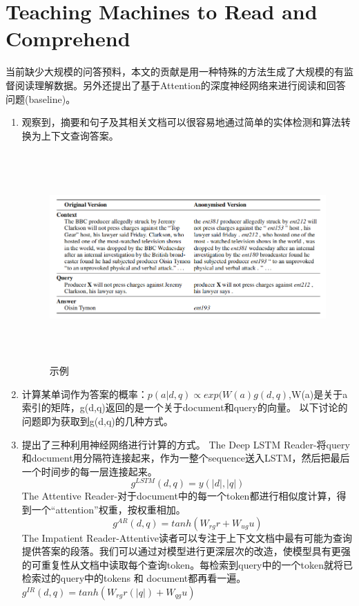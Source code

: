\documentclass[a4paper,UTF8]{article}
\numberwithin{equation}{section}
\begin{document}
\section{Teaching Machines to Read and Comprehend}
当前缺少大规模的问答预料，本文的贡献是用一种特殊的方法生成了大规模的有监督阅读理解数据。另外还提出了基于Attention的深度神经网络来进行阅读和回答问题(baseline)。
\begin{enumerate}
    \item 观察到，摘要和句子及其相关文档可以很容易地通过简单的实体检测和算法转换为上下文查询答案。
    \begin{figure}[H]
        \centering
        \includegraphics[height=8cm,width=16cm]{corpus.png}
        \caption{示例}
    \end{figure}
    \item 计算某单词作为答案的概率：$p(a|d,q) \propto exp(W(a)g(d,q)$,W(a)是关于a索引的矩阵，g(d,q)返回的是一个关于document和query的向量。
    以下讨论的问题即为获取到g(d,q)的几种方式。
    \item 提出了三种利用神经网络进行计算的方式。
        \subitem{[1]} The Deep LSTM Reader-将query和document用分隔符连接起来，作为一整个sequence送入LSTM，然后把最后一个时间步的每一层连接起来。$$ g^{LSTM}(d,q)=y(|d|,|q|)$$
        \subitem{[2]} The Attentive Reader-对于document中的每一个token都进行相似度计算，得到一个“attention”权重，按权重相加。$$g^{AR}(d,q)=tanh(W_{rg}r+W_{ug}u)$$
        \subitem{[3]} The Impatient Reader-Attentive读者可以专注于上下文文档中最有可能为查询提供答案的段落。我们可以通过对模型进行更深层次的改造，使模型具有更强的可重复性从文档中读取每个查询token。每检索到query中的一个token就将已检索过的query中的tokens 和 document都再看一遍。
    $g^{IR}(d,q)=tanh(W_{rg}r(|q|)+W_{qg}u) $
    \begin{figure}[H]
        \centering

\end{figure}
\end{enumerate}
\end{document}
